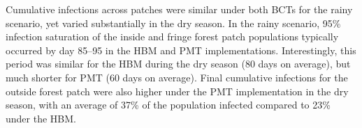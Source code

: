 \begin{figure}[hp!]
    \vspace{-1cm}
     \centering
    \label{fig:ch5-pmt-determinants}
\end{figure}

Cumulative infections across patches were similar under both BCTs for the rainy scenario, yet varied substantially in the dry season. In the rainy scenario, 95\% infection saturation of the inside and fringe forest patch populations typically occurred by day 85--95 in the HBM and PMT implementations. Interestingly, this period was similar for the HBM during the dry season (80 days on average), but much shorter for PMT (60 days on average). Final cumulative infections for the outside forest patch were also higher under the PMT implementation in the dry season, with an average of 37\% of the population infected compared to 23\% under the HBM.

